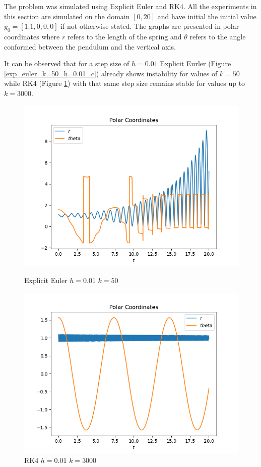 \documentclass{report}
\begin{document}
The problem was simulated using Explicit Euler and RK4.
All the experiments in this section are simulated on the domain $[0,20]$ and have initial the initial value $y_0 = [1.1, 0, 0, 0]$ if not otherwise stated.
The graphs are presented in polar coordinates where $r$ refers to the length of the spring and $\theta$ refers to the angle conformed between the pendulum and the vertical axis.

It can be observed that for a step size of $h=0.01$ Explicit Eurler (Figure \ref{exp_euler_k=50_h=0.01_c}) already shows instability for values of $k=50$ while RK4 (Figure \ref{rk4_h=0.01_k=3000_c}) with that same step size remains stable for values up to $k=3000$.

\begin{figure}[h]
\centering
\begin{minipage}[b]{0.45\textwidth}
\centering
\includegraphics[width=\textwidth]{../Plots/ExpEuler/exp_euler_k=50_h=0.01_c}
\caption{Explicit Euler $h=0.01$ $k=50$}
\label{exp_euler_k=50_h=0.01_c}
\end{minipage}
\hfill
\begin{minipage}[b]{0.45\textwidth}
\centering
\includegraphics[width=\textwidth]{../Plots/RK4/rk4_h=0.01_k=3000_c}
\caption{RK4 $h=0.01$ $k=3000$}
\label{rk4_h=0.01_k=3000_c}
\end{minipage}
\end{figure}
	
\end{document}
